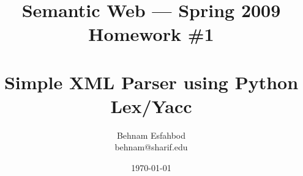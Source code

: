 \documentclass{article}
\newcommand{\problem}[1]{\section*{Problem #1}}
\newcommand{\subproblem}[1]{\subsection*{#1}}
\begin{document}
\title{Semantic Web --- Spring 2009\\Homework \#1\\~\\\huge{Simple XML Parser using Python Lex/Yacc}}
\author{Behnam Esfahbod\\behnam@sharif.edu}
\date{\today}
\maketitle













%


\end{document}

